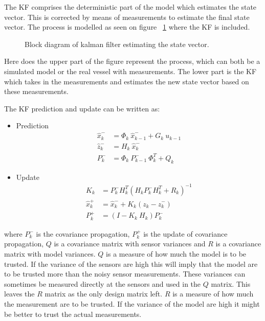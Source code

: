 The \ac{KF} comprises the deterministic part of the model which estimates the state vector. This is corrected by means of measurements to estimate the final state vector. The process is modelled as seen on figure ~\ref{fig:blockkf} where the \ac{KF} is included.

\begin{figure}
	\centering
	
	\caption{Block diagram of kalman filter estimating the state vector.}
	\label{fig:blockkf}
\end{figure}

Here does the upper part of the figure represent the process, which can both be a simulated model or the real vessel with measurements. The lower part is the \ac{KF} which takes in the measurements and estimates the new state vector based on these measurements.

The \ac{KF} prediction and update can be written as:
\begin{itemize}
\item Prediction
\begin{align}
\hat x_{k}^- &= \Phi_{k}\ \hat x_{k-1}^- + G_{k}\ u_{k-1}\nonumber\\
\hat z_{k}^- &= H_{k}\ \hat x_{k}^-\nonumber\\
P_{k}^- &= \Phi_{k}\ P_{k-1}^-\ \Phi_{k}^T + Q_{k}\nonumber
\end{align}

\item Update
\begin{align}
K_{k} &= P_{k}^- H_{k}^T(H_{k} P_{k}^- H_{k}^T+R_{k})^{-1}\nonumber\\
\hat x_{k}^+ &= \hat x_{k}^- + K_{k}(z_{k}-\hat z_{k}^-)\nonumber\\
P_{k}^+ &= (I-K_{k}\ H_{k})P_{k}^-\nonumber
\end{align}
\end{itemize}
where $P_{k}^-$ is the covariance propagation, $P_{k}^+$ is the update of covariance propagation, $Q$ is a covariance matrix with sensor variances and $R$ is a covariance matrix with model variances. $Q$ is a measure of how much the model is to be trusted. If the variance of the sensors are high this will imply that the model are to be trusted more than the noisy sensor measurements. These variances can sometimes be measured directly at the sensors and used in the $Q$ matrix. This leaves the $R$ matrix as the only design matrix left. $R$ is a measure of how much the measurement are to be trusted. If the variance of the model are high it might be better to trust the actual measurements.

